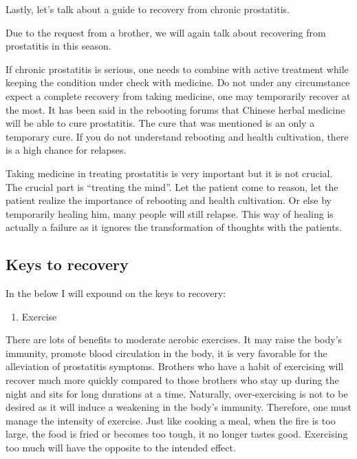 \documentclass[
]{book}
\providecommand{\tightlist}{%
  \setlength{\itemsep}{0pt}\setlength{\parskip}{0pt}}
\begin{document}
Lastly, let's talk about a guide to recovery from chronic prostatitis.

Due to the request from a brother, we will again talk about recovering from prostatitis in this season.

If chronic prostatitis is serious, one needs to combine with active treatment while keeping the condition under check with medicine. Do not under any circumstance expect a complete recovery from taking medicine, one may temporarily recover at the most. It has been said in the rebooting forums that Chinese herbal medicine will be able to cure prostatitis. The cure that was mentioned is an only a temporary cure. If you do not understand rebooting and health cultivation, there is a high chance for relapses.

Taking medicine in treating prostatitis is very important but it is not crucial. The crucial part is ``treating the mind''. Let the patient come to reason, let the patient realize the importance of rebooting and health cultivation. Or else by temporarily healing him, many people will still relapse. This way of healing is actually a failure as it ignores the transformation of thoughts with the patients.

\hypertarget{keys-to-recovery}{%
\subsection{Keys to recovery}\label{keys-to-recovery}}

In the below I will expound on the keys to recovery:

\begin{enumerate}
\def\labelenumi{\arabic{enumi}.}
\tightlist
\item
  Exercise
\end{enumerate}

There are lots of benefits to moderate aerobic exercises. It may raise the body's immunity, promote blood circulation in the body, it is very favorable for the alleviation of prostatitis symptoms. Brothers who have a habit of exercising will recover much more quickly compared to those brothers who stay up during the night and sits for long durations at a time. Naturally, over-exercising is not to be desired as it will induce a weakening in the body's immunity. Therefore, one must manage the intensity of exercise. Just like cooking a meal, when the fire is too large, the food is fried or becomes too tough, it no longer tastes good. Exercising too much will have the opposite to the intended effect.
\end{document}
